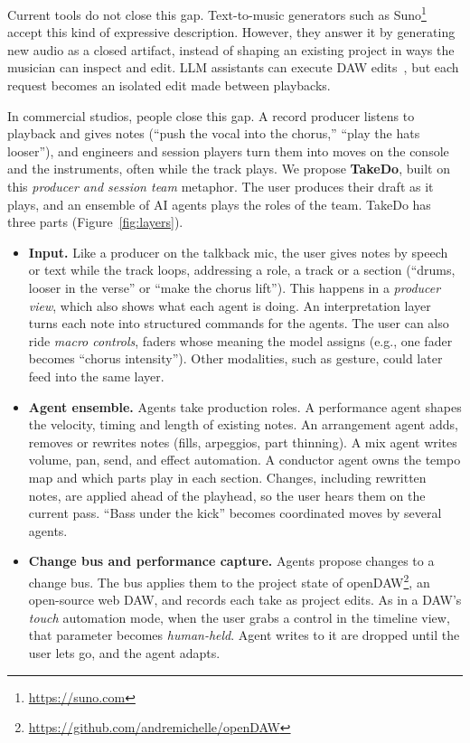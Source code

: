 \documentclass[sigconf,nonacm]{acmart}
\newcommand{\projectname}{TakeDo}
\begin{document}
Current tools do not close this gap. Text-to-music generators such as Suno\footnote{\url{https://suno.com}} accept this kind of expressive description. However, they answer it by generating new audio as a closed artifact, instead of shaping an existing project in ways the musician can inspect and edit. LLM assistants can execute DAW edits~\cite{elkins2025dawzy}, but each request becomes an isolated edit made between playbacks.

In commercial studios, people close this gap. A record producer listens to playback and gives notes (``push the vocal into the chorus,'' ``play the hats looser''), and engineers and session players turn them into moves on the console and the instruments, often while the track plays. We propose \textbf{\projectname{}}, built on this \emph{producer and session team} metaphor. The user produces their draft as it plays, and an ensemble of AI agents plays the roles of the team. \projectname{} has three parts (Figure~\ref{fig:layers}).
\begin{itemize}
  \item \textbf{Input.} Like a producer on the talkback mic, the user gives notes by speech or text while the track loops, addressing a role, a track or a section (``drums, looser in the verse'' or ``make the chorus lift''). This happens in a \emph{producer view}, which also shows what each agent is doing. An interpretation layer turns each note into structured commands for the agents. The user can also ride \emph{macro controls}, faders whose meaning the model assigns (e.g., one fader becomes ``chorus intensity''). Other modalities, such as gesture, could later feed into the same layer.
  \item \textbf{Agent ensemble.} Agents take production roles. A performance agent shapes the velocity, timing and length of existing notes. An arrangement agent adds, removes or rewrites notes (fills, arpeggios, part thinning). A mix agent writes volume, pan, send, and effect automation. A conductor agent owns the tempo map and which parts play in each section. Changes, including rewritten notes, are applied ahead of the playhead, so the user hears them on the current pass. ``Bass under the kick'' becomes coordinated moves by several agents.
  \item \textbf{Change bus and performance capture.} Agents propose changes to a change bus. The bus applies them to the project state of openDAW\footnote{\url{https://github.com/andremichelle/openDAW}}, an open-source web DAW, and records each take as project edits. As in a DAW's \emph{touch} automation mode, when the user grabs a control in the timeline view, that parameter becomes \emph{human-held}. Agent writes to it are dropped until the user lets go, and the agent adapts.
\end{itemize}
\end{document}
